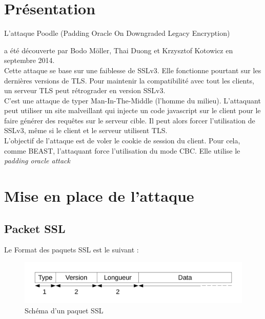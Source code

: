 
\chapter{Présentation}
\label{chapter:poodlePres}

L'attaque Poodle (Padding Oracle On Downgraded Legacy Encryption)

a été découverte par Bodo Möller, Thai Duong et 
Krzysztof Kotowicz\cite{article:ssl-poodle} en septembre 2014.\\

Cette attaque se base sur une faiblesse de SSLv3.
Elle fonctionne pourtant sur les dernières versions de TLS.
Pour maintenir la compatibilité avec tout les clients, un
serveur TLS peut rétrograder en version SSLv3.\\

C'est une attaque de typer Man-In-The-Middle (l'homme du milieu).
L'attaquant peut utiliser un site malveillant qui injecte un
code javascript sur le client pour le faire générer des requêtes
sur le serveur cible. Il peut alors forcer l'utilisation de 
SSLv3, même si le client et le serveur utilisent TLS.\\

L'objectif de l'attaque est de voler le cookie de session 
du client. Pour cela, comme BEAST, l'attaquant force 
l'utilisation du mode CBC. Elle utilise le \emph{padding oracle attack }

\chapter{Mise en place de l'attaque}
\label{chapter:Poodleattack}

\section{Packet SSL}
\label{sec:packet}

Le Format des paquets SSL est le suivant : 

\begin{figure}[h]
  \centering
  \includegraphics[scale=0.5]{schemaSSL.pdf}
  \caption{Schéma d'un paquet SSL}
  \label{fig:ssl}
\end{figure}


